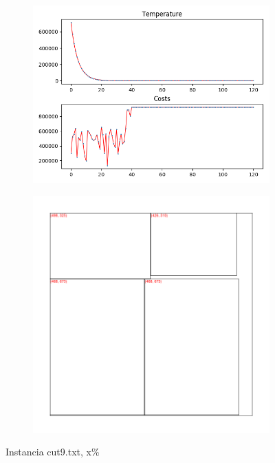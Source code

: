 \begin{figure}
\centering
\begin{subfigure}{.5\textwidth}
  \centering
  \includegraphics[width=1\linewidth]{results/cut9/1/plot}
  \label{fig:sub1}
\end{subfigure}%
\begin{subfigure}{.5\textwidth}
  \centering
  \includegraphics[width=1\linewidth]{results/cut9/1/cut}
  \label{fig:sub2}
\end{subfigure}
\caption{Instancia cut9.txt, x\%}
\label{fig:test}
\end{figure}

